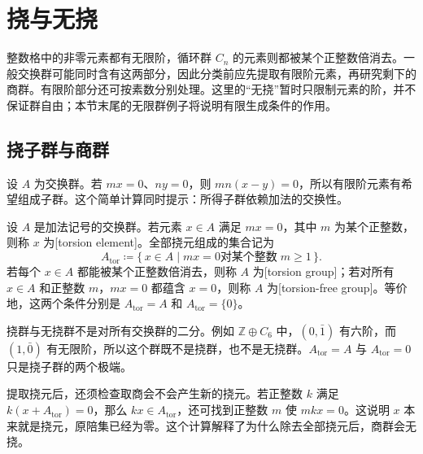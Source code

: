 
\section{挠与无挠}
\label{b1:sec:0902}

整数格中的非零元素都有无限阶，循环群 \(C_n\) 的元素则都被某个正整数倍消去。一般交换群可能同时含有这两部分，因此分类前应先提取有限阶元素，再研究剩下的商群。有限阶部分还可按素数分别处理。这里的“无挠”暂时只限制元素的阶，并不保证群自由；本节末尾的无限群例子将说明有限生成条件的作用。

%
%

\subsection{挠子群与商群}
\label{b1:subsec:0902:01}

设 \(A\) 为交换群。若 \(mx=0\)、\(ny=0\)，则 \(mn(x-y)=0\)，所以有限阶元素有希望组成子群。这个简单计算同时提示：所得子群依赖加法的交换性。

\begin{definition}\label{b1:def:torsion-subgroup}
	设 \(A\) 是加法记号的交换群。若元素 \(x\in A\) 满足 \(mx=0\)，其中 \(m\) 为某个正整数，则称 \(x\) 为[torsion element]。全部挠元组成的集合记为
	\[
		A_{\mathrm{tor}}\coloneqq\{\,x\in A\mid mx=0 \text{对某个整数}\;m\ge1\,\}.
	\]
	若每个 \(x\in A\) 都能被某个正整数倍消去，则称 \(A\) 为[torsion group]；若对所有 \(x\in A\) 和正整数 \(m\)，\(mx=0\) 都蕴含 \(x=0\)，则称 \(A\) 为[torsion-free group]。等价地，这两个条件分别是 \(A_{\mathrm{tor}}=A\) 和 \(A_{\mathrm{tor}}=\{0\}\)。
\end{definition}


挠群与无挠群不是对所有交换群的二分。例如 \(\mathbb Z\oplus C_6\) 中，\((0,\bar1)\) 有六阶，而 \((1,\bar0)\) 有无限阶，所以这个群既不是挠群，也不是无挠群。\(A_{\mathrm{tor}}=A\) 与 \(A_{\mathrm{tor}}=0\) 只是挠子群的两个极端。

\ProseParagraphBreak
提取挠元后，还须检查取商会不会产生新的挠元。若正整数 \(k\) 满足 \(k(x+A_{\mathrm{tor}})=0\)，那么 \(kx\in A_{\mathrm{tor}}\)，还可找到正整数 \(m\) 使 \(mkx=0\)。这说明 \(x\) 本来就是挠元，原陪集已经为零。这个计算解释了为什么除去全部挠元后，商群会无挠。

